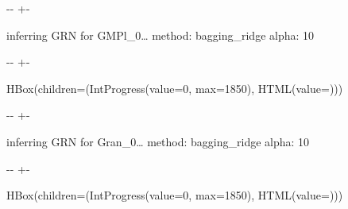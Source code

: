 \documentclass[letterpaper,10pt,english]{sphinxmanual}
\newlength\nbsphinxcodecellspacing
\begin{document}
%
{
\kern-\sphinxverbatimsmallskipamount\kern-\baselineskip
\kern+\FrameHeightAdjust\kern-\fboxrule
\vspace{\nbsphinxcodecellspacing}
%
\begin{sphinxVerbatim}[commandchars=\\\{\}]

inferring GRN for GMPl\_0{\ldots}
method: bagging\_ridge
alpha: 10
\end{sphinxVerbatim}
}
\relax

{

\kern-\sphinxverbatimsmallskipamount\kern-\baselineskip
\kern+\FrameHeightAdjust\kern-\fboxrule
\vspace{\nbsphinxcodecellspacing}

%
\begin{sphinxVerbatim}[commandchars=\\\{\}]
HBox(children=(IntProgress(value=0, max=1850), HTML(value=\PYGZsq{}\PYGZsq{})))
\end{sphinxVerbatim}
}



%
{
\kern-\sphinxverbatimsmallskipamount\kern-\baselineskip
\kern+\FrameHeightAdjust\kern-\fboxrule
\vspace{\nbsphinxcodecellspacing}
%
\begin{sphinxVerbatim}[commandchars=\\\{\}]

inferring GRN for Gran\_0{\ldots}
method: bagging\_ridge
alpha: 10
\end{sphinxVerbatim}
}
\relax

{

\kern-\sphinxverbatimsmallskipamount\kern-\baselineskip
\kern+\FrameHeightAdjust\kern-\fboxrule
\vspace{\nbsphinxcodecellspacing}

%
\begin{sphinxVerbatim}[commandchars=\\\{\}]
HBox(children=(IntProgress(value=0, max=1850), HTML(value=\PYGZsq{}\PYGZsq{})))
\end{sphinxVerbatim}
}
\end{document}
